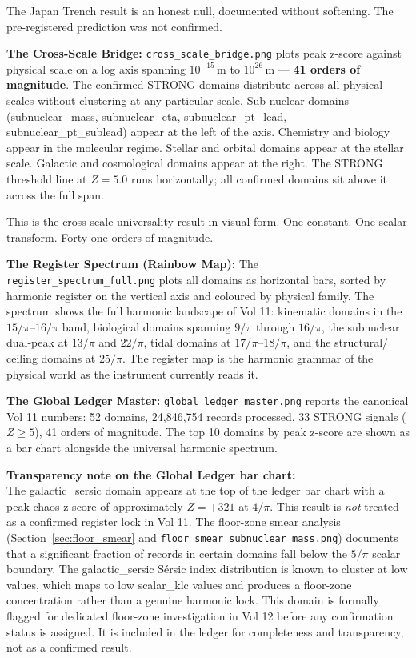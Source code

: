 \documentclass[11pt, letterpaper, openany]{book}
\begin{document}
\begin{empiricalbox}
The Japan Trench result is an honest null, documented without softening.
The pre-registered prediction was not confirmed.

\textbf{The Cross-Scale Bridge:}
\texttt{cross\_scale\_bridge.png} plots peak z-score against physical scale
on a log axis spanning $10^{-15}$\,m to $10^{26}$\,m --- \textbf{41 orders
of magnitude}. The confirmed STRONG domains distribute across all physical
scales without clustering at any particular scale. Sub-nuclear domains
(subnuclear\_mass, subnuclear\_eta, subnuclear\_pt\_lead,
subnuclear\_pt\_sublead) appear at the left of the axis. Chemistry and
biology appear in the molecular regime. Stellar and orbital domains
appear at the stellar scale. Galactic and cosmological domains appear
at the right. The STRONG threshold line at $Z=5.0$ runs horizontally;
all confirmed domains sit above it across the full span.

This is the cross-scale universality result in visual form. One constant.
One scalar transform. Forty-one orders of magnitude.

\textbf{The Register Spectrum (Rainbow Map):}
The \texttt{register\_spectrum\_full.png} plots all domains as horizontal
bars, sorted by harmonic register on the vertical axis and coloured by
physical family. The spectrum shows the full harmonic landscape of Vol 11:
kinematic domains in the $15/\pi$--$16/\pi$ band, biological domains
spanning $9/\pi$ through $16/\pi$, the subnuclear dual-peak at $13/\pi$
and $22/\pi$, tidal domains at $17/\pi$--$18/\pi$, and the structural/
ceiling domains at $25/\pi$. The register map is the harmonic grammar
of the physical world as the instrument currently reads it.

\textbf{The Global Ledger Master:}
\texttt{global\_ledger\_master.png} reports the canonical Vol 11 numbers:
52 domains, 24,846,754 records processed, 33 STRONG signals ($Z \geq 5$),
41 orders of magnitude. The top 10 domains by peak z-score are shown as
a bar chart alongside the universal harmonic spectrum.

\begin{warningbox}
\textbf{Transparency note on the Global Ledger bar chart:}\\[0.5em]
The galactic\_sersic domain appears at the top of the ledger bar chart
with a peak chaos z-score of approximately $Z = +321$ at $4/\pi$. This
result is \textit{not} treated as a confirmed register lock in Vol 11.
The floor-zone smear analysis (Section~\ref{sec:floor_smear} and
\texttt{floor\_smear\_subnuclear\_mass.png}) documents that a significant
fraction of records in certain domains fall below the $5/\pi$ scalar
boundary. The galactic\_sersic S\'{e}rsic index distribution is known
to cluster at low values, which maps to low scalar\_klc values and
produces a floor-zone concentration rather than a genuine harmonic lock.
This domain is formally flagged for dedicated floor-zone investigation
in Vol 12 before any confirmation status is assigned. It is included
in the ledger for completeness and transparency, not as a confirmed result.
\end{warningbox}


\end{empiricalbox}
\end{document}
